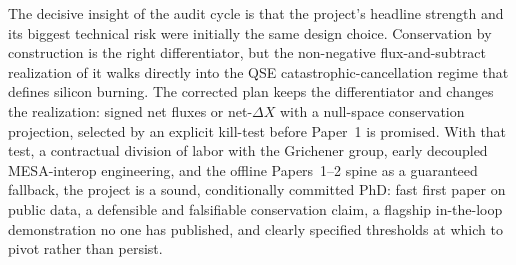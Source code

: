 \documentclass[11pt,a4paper]{article}
\begin{document}
The decisive insight of the audit cycle is that the project's headline strength and its biggest technical risk were initially the same design choice. Conservation by construction is the right differentiator, but the non-negative flux-and-subtract realization of it walks directly into the QSE catastrophic-cancellation regime that defines silicon burning. The corrected plan keeps the differentiator and changes the realization: signed net fluxes or net-$\Delta X$ with a null-space conservation projection, selected by an explicit kill-test before Paper~1 is promised. With that test, a contractual division of labor with the Grichener group, early decoupled MESA-interop engineering, and the offline Papers~1--2 spine as a guaranteed fallback, the project is a sound, conditionally committed PhD: fast first paper on public data, a defensible and falsifiable conservation claim, a flagship in-the-loop demonstration no one has published, and clearly specified thresholds at which to pivot rather than persist.
\end{document}

